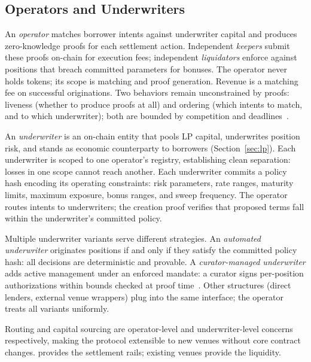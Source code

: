 \subsection{Operators and Underwriters}

An \emph{operator} matches borrower intents against underwriter capital and produces zero-knowledge proofs for each settlement action. Independent \emph{keepers} submit these proofs on-chain for execution fees; independent \emph{liquidators} enforce against positions that breach committed parameters for bonuses. The operator never holds tokens; its scope is matching and proof generation. Revenue is a matching fee on successful originations. Two behaviors remain unconstrained by proofs: liveness (whether to produce proofs at all) and ordering (which intents to match, and to which underwriter); both are bounded by competition and deadlines~\cite{daloc-decent2026}.

An \emph{underwriter} is an on-chain entity that pools LP capital, underwrites position risk, and stands as economic counterparty to borrowers (Section~\ref{sec:lp}). Each underwriter is scoped to one operator's registry, establishing clean separation: losses in one scope cannot reach another. Each underwriter commits a policy hash encoding its operating constraints: risk parameters, rate ranges, maturity limits, maximum exposure, bonus ranges, and sweep frequency. The operator routes intents to underwriters; the creation proof verifies that proposed terms fall within the underwriter's committed policy.

Multiple underwriter variants serve different strategies. An \emph{automated underwriter} originates positions if and only if they satisfy the committed policy hash: all decisions are deterministic and provable. A \emph{curator-managed underwriter} adds active management under an enforced mandate: a curator signs per-position authorizations within bounds checked at proof time~\cite{daloc-decent2026}. Other structures (direct lenders, external venue wrappers) plug into the same interface; the operator treats all variants uniformly.

Routing and capital sourcing are operator-level and underwriter-level concerns respectively, making the protocol extensible to new venues without core contract changes. \daloc{} provides the settlement rails; existing venues provide the liquidity.
